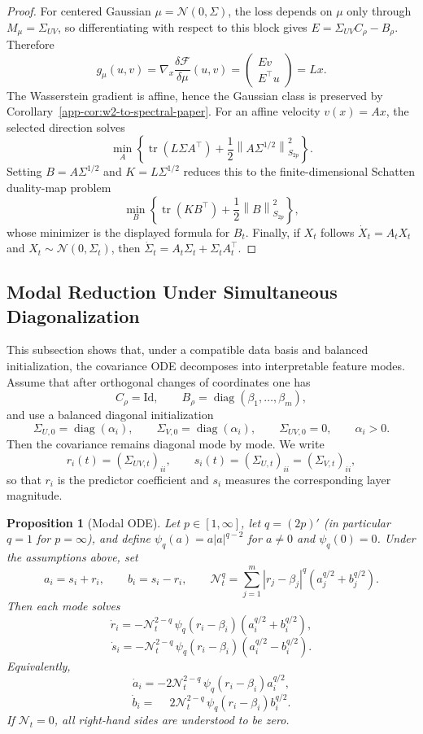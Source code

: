 \documentclass{article}
\newtheorem{proposition}[theorem]{Proposition}
\newcommand{\MF}{\mathcal{F}}
\newcommand{\tr}{\operatorname{tr}}
\newcommand{\Id}{\mathrm{Id}}
\newcommand{\diag}{\operatorname{diag}}
\newcommand{\norm}[1]{\left\lVert #1 \right\rVert}
\newcommand{\abs}[1]{\left\lvert #1 \right\rvert}
\begin{document}
\begin{proof}
For centered Gaussian $\mu=\mathcal N(0,\Sigma)$, the loss depends on $\mu$
only through $M_\mu=\Sigma_{UV}$, so differentiating with respect to this
block gives $E=\Sigma_{UV}C_\rho-B_\rho$. Therefore
$$
g_\mu(u,v)=\nabla_x\frac{\delta\MF}{\delta\mu}(u,v)=
\begin{pmatrix}
Ev\\ E^\top u
\end{pmatrix}
=Lx.
$$
The Wasserstein gradient is affine, hence the Gaussian class is preserved by
Corollary~\ref{app-cor:w2-to-spectral-paper}. For an affine velocity
$v(x)=Ax$, the selected direction solves
$$
\min_A\left\{\tr(L\Sigma A^\top)+\frac12\norm{A\Sigma^{1/2}}_{S_{2p}}^2\right\}.
$$
Setting $B=A\Sigma^{1/2}$ and $K=L\Sigma^{1/2}$ reduces this to the finite-dimensional Schatten duality-map problem
$$
\min_B\left\{\tr(KB^\top)+\frac12\norm{B}_{S_{2p}}^2\right\},
$$
whose minimizer is the displayed formula for $B_t$. Finally, if $X_t$ follows $\dot X_t=A_tX_t$ and $X_t\sim\mathcal N(0,\Sigma_t)$, then $\dot\Sigma_t=A_t\Sigma_t+\Sigma_tA_t^\top$.
\end{proof}

\subsection{Modal Reduction Under Simultaneous Diagonalization}
This subsection shows that, under a compatible data basis and balanced initialization, the covariance ODE decomposes into interpretable feature modes.
Assume that after orthogonal changes of coordinates one has
$$
C_\rho=\Id,
\qquad
B_\rho=\diag(\beta_1,\dots,\beta_m),
$$
and use a balanced diagonal initialization
$$
\Sigma_{U,0}=\diag(\alpha_i),
\qquad
\Sigma_{V,0}=\diag(\alpha_i),
\qquad
\Sigma_{UV,0}=0,
\qquad
\alpha_i>0.
$$
Then the covariance remains diagonal mode by mode. We write
$$
r_i(t)=(\Sigma_{UV,t})_{ii},
\qquad
s_i(t)=(\Sigma_{U,t})_{ii}=(\Sigma_{V,t})_{ii},
$$
so that $r_i$ is the predictor coefficient and $s_i$ measures the corresponding layer magnitude.

\begin{proposition}[Modal ODE]
\label{app-prop:modal-ode-paper}
\label{prop:modal-main}
Let $p\in[1,\infty]$, let $q=(2p)'$ (in particular $q=1$ for $p=\infty$), and define
$\psi_q(a)=a|a|^{q-2}$ for $a\ne0$ and $\psi_q(0)=0$. Under the assumptions
above, set
$$
a_i=s_i+r_i,
\qquad
b_i=s_i-r_i,
\qquad
\mathcal N_t^q=
\sum_{j=1}^m \abs{r_j-\beta_j}^q\left(a_j^{q/2}+b_j^{q/2}\right).
$$
Then each mode solves
$$
\dot r_i
=
-\mathcal N_t^{2-q}\,\psi_q(r_i-\beta_i)
\left(a_i^{q/2}+b_i^{q/2}\right),
$$
$$
\dot s_i
=
-\mathcal N_t^{2-q}\,\psi_q(r_i-\beta_i)
\left(a_i^{q/2}-b_i^{q/2}\right).
$$
Equivalently,
$$
\dot a_i=-2\mathcal N_t^{2-q}\,\psi_q(r_i-\beta_i)a_i^{q/2},
$$
$$
\dot b_i=\phantom{-}2\mathcal N_t^{2-q}\,\psi_q(r_i-\beta_i)b_i^{q/2}.
$$
If $\mathcal N_t=0$, all right-hand sides are understood to be zero.
\end{proposition}
\end{document}

